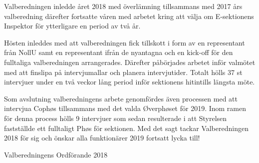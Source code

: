 \documentclass[../_main/handlingar.tex]{subfiles}
\begin{document}

Valberedningen inledde året 2018 med överlämning tillsammans med 2017 års valberedning därefter fortsatte våren med arbetet kring att välja om E-sektionens Inspektor för ytterligare en period av två år. 

Hösten inleddes med att valberedningen fick tillskott i form av en representant från NollU samt en representant ifrån de nyantagna och en kick-off för den fulltaliga valberedningen arrangerades. Därefter påbörjades arbetet inför valmötet med att finslipa på intervjumallar och planera intervjutider. Totalt hölls 37 st intervjuer under en två veckor lång period inför sektionens hitintills längsta möte. 

Som avslutning valberedningens arbete genomfördes även processen med att intervjua Cophøs tillsammans med det valda Øverphøset för 2019. Inom ramen för denna process hölls 9 intervjuer som sedan resulterade i att Styrelsen fastställde ett fulltaligt Phøs för sektionen. Med det sagt tackar Valberedningen 2018 för sig och önskar alla funktionärer 2019 fortsatt lycka till! 



\begin{signatures}{1}
    \mvh
    \signature{Pontus Landgren}{Valberedningens Ordförande 2018}
\end{signatures}
\end{document}
